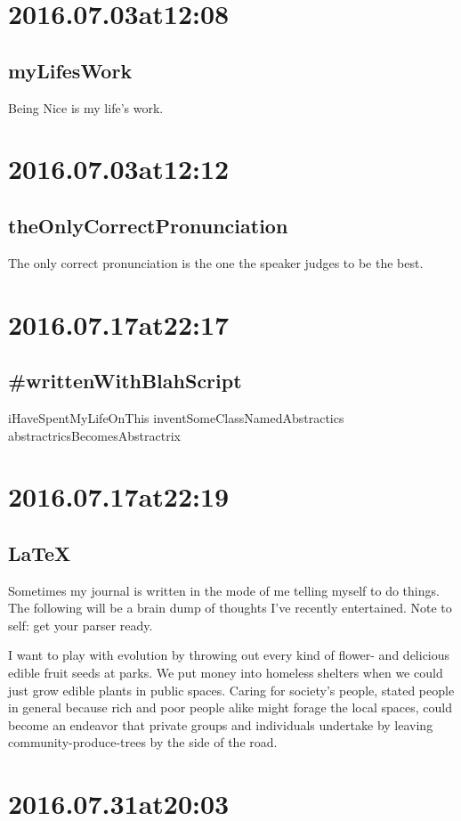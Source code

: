 \begin{enumerate}
\section*{ 2016.07.03at12:08 }
\subsection*{myLifesWork}
Being Nice is my life's work.

\section*{ 2016.07.03at12:12 }
\subsection*{theOnlyCorrectPronunciation}
The only correct pronunciation is the one the speaker judges to be the best.


\section*{ 2016.07.17at22:17 }
\subsection*{ #writtenWithBlahScript }
iHaveSpentMyLifeOnThis inventSomeClassNamedAbstractics abstractricsBecomesAbstractrix

\section*{ 2016.07.17at22:19 }
\subsection*{LaTeX}
Sometimes my journal is written in the mode of me telling myself to do things. The following will be a brain dump of thoughts I've recently entertained. Note to self: get your parser ready.

I want to play with evolution by throwing out every kind of flower- and delicious edible fruit seeds at parks. We put money into homeless shelters when we could just grow edible plants in public spaces. Caring for society's people, stated people in general because rich and poor people alike might forage the local spaces, could become an endeavor that private groups and individuals undertake by leaving community-produce-trees by the side of the road.

\section*{ 2016.07.31at20:03 }

\end{enumerate}
